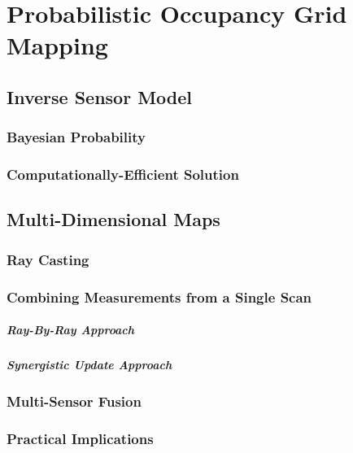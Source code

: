 
\chapter{Probabilistic Occupancy Grid Mapping} \label{chap:pogm}


\section{Inverse Sensor Model}

\subsection{Bayesian Probability}

\subsection{Computationally-Efficient Solution}

\section{Multi-Dimensional Maps}

\subsection{Ray Casting}

\subsection{Combining Measurements from a Single Scan}

\paragraph{Ray-By-Ray Approach}

\paragraph{Synergistic Update Approach}

\subsection{Multi-Sensor Fusion}

\subsection{Practical Implications}

